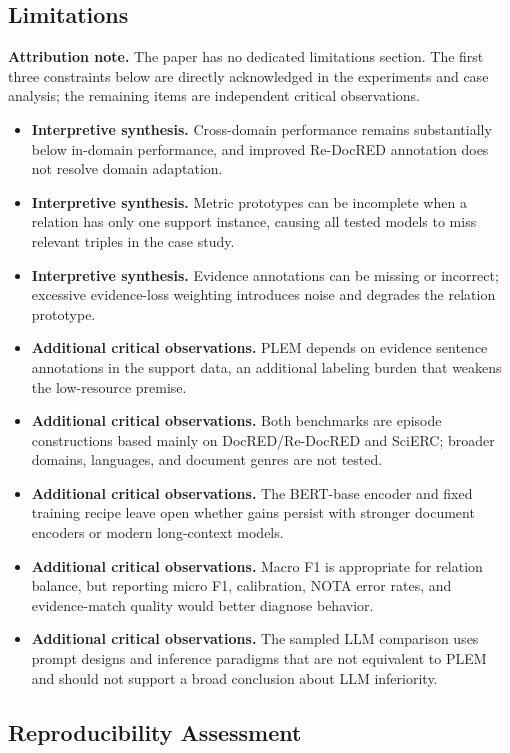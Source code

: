 \documentclass[11pt]{article}
\begin{document}
\subsection{Limitations}\label{limitations-4}

\textbf{Attribution note.} The paper has no dedicated limitations
section. The first three constraints below are directly acknowledged in
the experiments and case analysis; the remaining items are independent
critical observations.

\begin{itemize}
\item
  \textbf{Interpretive synthesis.} Cross-domain performance remains substantially below
  in-domain performance, and improved Re-DocRED annotation does not
  resolve domain adaptation.
\item
  \textbf{Interpretive synthesis.} Metric prototypes can be incomplete when a relation
  has only one support instance, causing all tested models to miss
  relevant triples in the case study.
\item
  \textbf{Interpretive synthesis.} Evidence annotations can be missing or incorrect;
  excessive evidence-loss weighting introduces noise and degrades the
  relation prototype.
\item
  \textbf{Additional critical observations.} PLEM depends on evidence sentence annotations in
  the support data, an additional labeling burden that weakens the
  low-resource premise.
\item
  \textbf{Additional critical observations.} Both benchmarks are episode constructions based
  mainly on DocRED/Re-DocRED and SciERC; broader domains, languages, and
  document genres are not tested.
\item
  \textbf{Additional critical observations.} The BERT-base encoder and fixed training recipe
  leave open whether gains persist with stronger document encoders or
  modern long-context models.
\item
  \textbf{Additional critical observations.} Macro F1 is appropriate for relation balance, but
  reporting micro F1, calibration, NOTA error rates, and evidence-match
  quality would better diagnose behavior.
\item
  \textbf{Additional critical observations.} The sampled LLM comparison uses prompt designs
  and inference paradigms that are not equivalent to PLEM and should not
  support a broad conclusion about LLM inferiority.
\end{itemize}

\subsection{Reproducibility
Assessment}\label{reproducibility-assessment-4}
\end{document}
